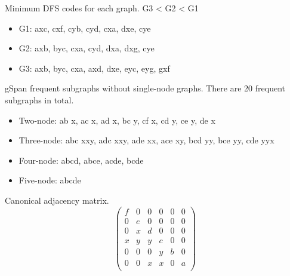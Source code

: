 \documentclass{homework}
\begin{document}
\question
Minimum DFS codes for each graph. G3 < G2 < G1
\begin{itemize}
    \item G1: axc, cxf, cyb, cyd, cxa, dxe, cye
    \item G2: axb, byc, cxa, cyd, dxa, dxg, cye
    \item G3: axb, byc, cxa, axd, dxe, eyc, eyg, gxf
\end{itemize}

gSpan frequent subgraphs without single-node graphs. There are 20 frequent subgraphs in total.
\begin{itemize}
    \item Two-node: ab x, ac x, ad x, bc y, cf x, cd y, ce y, de x
    \item Three-node: abc xxy, adc xxy, ade xx, ace xy, bcd yy, bce yy, cde yyx
    \item Four-node: abcd, abce, acde, bcde
    \item Five-node: abcde
\end{itemize}

Canonical adjacency matrix.
\[\begin{pmatrix}
    f & 0 & 0 & 0 & 0 & 0   \\
    0 & e & 0 & 0 & 0 & 0   \\
    0 & x & d & 0 & 0 & 0   \\
    x & y & y & c & 0 & 0   \\
    0 & 0 & 0 & y & b & 0   \\
    0 & 0 & x & x & 0 & a   \\
\end{pmatrix}
\]
\end{document}

